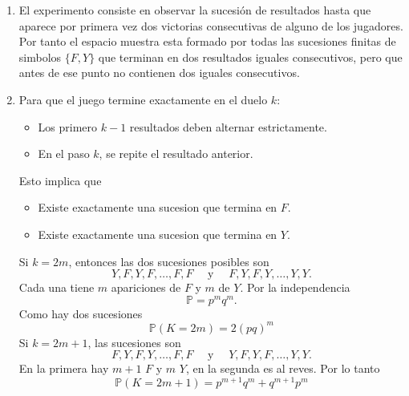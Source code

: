 \documentclass[12pt,a4paper]{article}
\begin{document}
    \begin{solucion}
        \begin{enumerate}
            \item[(a)] El experimento consiste en observar la sucesión de resultados hasta que aparece por primera vez
            dos victorias consecutivas de alguno de los jugadores. Por tanto el espacio muestra esta formado
            por todas las sucesiones finitas de simbolos $\{F, Y\}$ que terminan en dos resultados iguales
            consecutivos, pero que antes de ese punto no contienen dos iguales consecutivos.
            \item[(b)] Para que el juego termine exactamente en el duelo $k$:
            \begin{itemize}
                \item Los primero $k-1$ resultados deben alternar estrictamente.
                \item En el paso $k$, se repite el resultado anterior.
            \end{itemize}
            Esto implica que
            \begin{itemize}
                \item Existe exactamente una sucesion que termina en $F$.
                \item Existe exactamente una sucesion que termina en $Y$.
            \end{itemize}
            Si $k=2m$, entonces las dos sucesiones posibles son
            \begin{equation*}
                Y,F,Y,F,\dots,F,F\quad\text{ y }\quad F,Y,F,Y,\dots,Y,Y.
            \end{equation*}
            Cada una tiene $m$ apariciones de $F$ y $m$ de $Y$. Por la independencia
            \begin{equation*}
                \mathbb{P}=p^{m}q^{m}.
            \end{equation*}
            Como hay dos sucesiones
            \begin{equation*}
                \mathbb{P}(K=2m)=2(pq)^{m}
            \end{equation*}
            Si $k=2m+1$, las sucesiones son
            \begin{equation*}
                F,Y,F,Y,\dots,F,F\quad\text{ y }\quad Y,F,Y,F,\dots,Y,Y.
            \end{equation*}
            En la primera hay $m+1$ $F$ y $m$ $Y$, en la segunda es al reves. Por lo tanto
            \begin{equation*}
                \mathbb{P}(K=2m+1)=p^{m+1}q^{m}+q^{m+1}p^{m}
            \end{equation*}
        \end{enumerate}
    \end{solucion}
\end{document}
